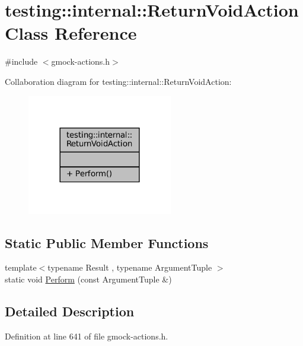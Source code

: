 \hypertarget{classtesting_1_1internal_1_1ReturnVoidAction}{}\section{testing\+:\+:internal\+:\+:Return\+Void\+Action Class Reference}
\label{classtesting_1_1internal_1_1ReturnVoidAction}


{\ttfamily \#include $<$gmock-\/actions.\+h$>$}



Collaboration diagram for testing\+:\+:internal\+:\+:Return\+Void\+Action\+:
\nopagebreak
\begin{figure}[H]
\begin{center}
\leavevmode
\includegraphics[width=180pt]{classtesting_1_1internal_1_1ReturnVoidAction__coll__graph}
\end{center}
\end{figure}
\subsection*{Static Public Member Functions}
\begin{DoxyCompactItemize}
\item 
{\footnotesize template$<$typename Result , typename Argument\+Tuple $>$ }\\static void \hyperlink{classtesting_1_1internal_1_1ReturnVoidAction_ab9ea50ff501225b7510a623d0f0a405e}{Perform} (const Argument\+Tuple \&)
\end{DoxyCompactItemize}


\subsection{Detailed Description}


Definition at line 641 of file gmock-\/actions.\+h.



